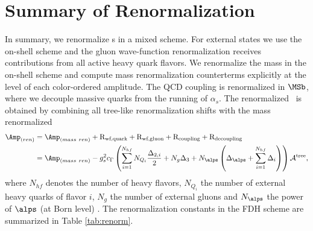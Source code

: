 
\section{Summary of Renormalization}
\label{sec:summary}
In summary, we renormalize \ola s in a mixed scheme. For external states we use the on-shell
scheme and the gluon wave-function renormalization receives contributions from all
active heavy quark flavors. We renormalize the mass in the on-shell scheme
and compute mass renormalization counterterms
explicitly at the level of each color-ordered amplitude. The QCD coupling is renormalized in $\MSb$, where we decouple massive quarks from the
running of $\alpha_s$. The renormalized \ola~is obtained by combining all tree-like renormalization shifts with the mass renormalized \ola
\begin{align}
\begin{split}
  \Amp_{(ren)}&=
  \Amp_{(mass\
    ren)}+\text{R}_{\text{wf,quark}}+\text{R}_{\text{wf,gluon}}+\text{R}_{\text{coupling}}+\text{R}_{\text{decoupling}}\\
&= \Amp_{(mass\
    ren)}-g_s^2 c_\Gamma \left( \sum_{i=1}^{N_{hf}} N_{Q_i} \frac{\Delta_{2,i}}{2} + N_{g}\Delta_3 +
    N_{\alps}\left(\Delta_{\alps} + \sum_{i=1}^{N_{hf}}\Delta_i\right) \right)  \mathcal{A}^{\text{tree}},
\end{split}
\end{align}
where $N_{hf}$ denotes the number of heavy flavors, $N_{Q_i}$ the number of external heavy quarks of flavor $i$, $N_g$ the number of external
gluons and $N_{\alps}$ the power of $\alps$ (at Born level) . The
renormalization constants in the FDH scheme are summarized in Table \ref{tab:renorm}.
